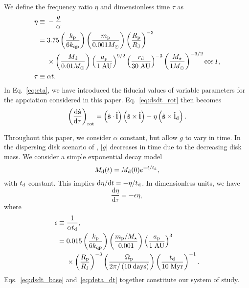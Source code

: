 \documentclass[
        fleqn,
        usenatbib,
        referee,
    ]{mnras}
\newcommand*{\rd}[2]{\frac{\mathrm{d}#1}{\mathrm{d}#2}}
\newcommand*{\abs}[1]{\left|#1\right|}
\newcommand*{\bm}[1]{\boldsymbol{\mathbf{#1}}}
\newcommand*{\uv}[1]{\hat{\bm{#1}}}
\newcommand*{\p}[1]{\left(#1\right)}
\begin{document}
We define the frequency ratio $\eta$ and dimensionless time $\tau$ as
\begin{align}
    \eta \equiv{}& -\frac{g}{\alpha}\nonumber\\
        ={}& 3.75 \p{\frac{k_{\rm p}}{6k_{\rm qp}}}
            \p{\frac{m_{\rm p}}{0.001 M_\odot}}
            \p{\frac{R_{\rm p}}{R_{\rm J}}}^{-3}\nonumber\\
        &\times \p{\frac{M_{\rm d}}{0.01 M_{\odot}}}
            \p{\frac{a_{\rm p}}{1\;\mathrm{AU}}}^{9/2}
            \p{\frac{r_{\rm d}}{30 \;\mathrm{AU}}}^{-3}
            \p{\frac{M_\star}{1M_{\odot}}}^{-3/2}
            \cos I,\label{eq:eta}\\
    \tau \equiv{}& \alpha t.
\end{align}
In Eq.~\eqref{eq:eta}, we have introduced the fiducial values of variable
parameters for the appciation considered in this paper. Eq.~\eqref{eq:dsdt_rot}
then becomes
\begin{equation}
    \p{\rd{\uv{s}}{\tau}}_{\rm rot} = \p{\uv{s} \cdot \uv{l}}
            \p{\uv{s} \times \uv{l}}
        - \eta\p{\uv{s} \times \uv{l}_{\rm d}}. \label{eq:dsdt_base}
\end{equation}

Throughout this paper, we consider $\alpha$ constant, but allow $g$ to vary in
time. In the dispersing disk scenario of \citet{millholland_disk}, $\abs{g}$
decreases in time due to the decreasing disk mass. We consider a simple
exponential decay model
\begin{equation}
    M_{\rm d}(t) = M_{\rm d}(0)e^{-t/t_{\rm d}},\label{eq:dmd_dt}
\end{equation}
with $t_{\rm d}$ constant. This implies $\mathrm{d}\eta / \mathrm{d}t = -\eta /
t_{\rm d}$. In dimensionless units, we have
\begin{equation}
    \rd{\eta}{\tau} = -\epsilon \eta\label{eq:deta_dt},
\end{equation}
where
\begin{align}
    \epsilon \equiv{}& \frac{1}{\alpha t_{\rm d}},\label{eq:eps_def}\\
        ={}& 0.015 \p{\frac{k_{\rm p}}{6k_{\rm qp}}}
            \p{\frac{m_{\rm p}/M_\star}{0.001}}
            \p{\frac{a_{\rm p}}{1\;\mathrm{AU}}}^3\nonumber\\
        &\times \p{\frac{R_{\rm p}}{R_{\rm J}}}^{-3}
            \p{\frac{\Omega_{\rm p}}{2\pi/\p{10\;\mathrm{days}}}}
            \p{\frac{t_{\rm d}}{10\;\mathrm{Myr}}}^{-1}.
\end{align}
Eqs.~\eqref{eq:dsdt_base} and~\eqref{eq:deta_dt} together constitute our system
of study.
\end{document}
